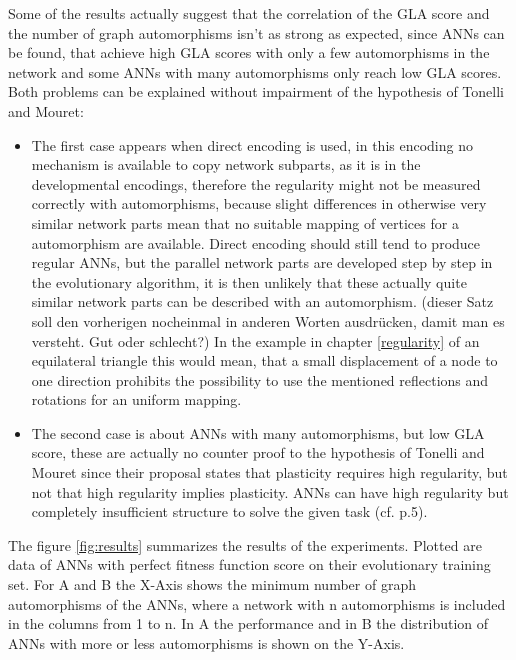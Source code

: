\documentclass[12pt,twoside]{article}
\theoremstyle{plain}
\theoremstyle{definition}
\theoremstyle{remark}
\begin{document}
Some of the results actually suggest that the correlation of the GLA score and the number of graph automorphisms isn't as strong as expected, since ANNs can be found, that achieve high GLA scores with only a few automorphisms in the network and some ANNs with many automorphisms only reach low GLA scores. Both problems can be explained without impairment of the hypothesis of Tonelli and Mouret:
\begin{itemize}
	\item The first case appears when direct encoding is used, in this encoding no mechanism is available to copy network subparts, as it is in the developmental encodings, therefore the regularity might not be measured correctly with automorphisms, because slight differences in otherwise very similar network parts mean that no suitable mapping of vertices for a automorphism are available. Direct encoding should still tend to produce regular ANNs, but the parallel network parts are developed step by step in the evolutionary algorithm, it is then unlikely that these actually quite similar network parts can be described with an automorphism. (dieser Satz soll den vorherigen nocheinmal in anderen Worten ausdrücken, damit man es versteht. Gut oder schlecht?)
In the example in chapter \ref{regularity} of an equilateral triangle this would mean, that a small displacement of a node to one direction prohibits the possibility to use the mentioned reflections and rotations for an uniform mapping.
	\item The second case is about ANNs with many automorphisms, but low GLA score, these are actually no counter proof to the hypothesis of Tonelli and Mouret since their proposal states that plasticity requires high regularity, but not that high regularity implies plasticity. ANNs can have high regularity but completely insufficient structure to solve the given task (cf. \cite{citeulike:12788284} p.5).
\end{itemize} 

The figure \ref{fig:results} summarizes the results of the experiments. Plotted are data of ANNs with perfect fitness function score on their evolutionary training set.
For A and B the X-Axis shows the minimum number of graph automorphisms of the ANNs, where a network with n automorphisms is included in the columns from 1 to n. In A the performance and in B the distribution of ANNs with more or less automorphisms is shown on the Y-Axis.
\end{document}
